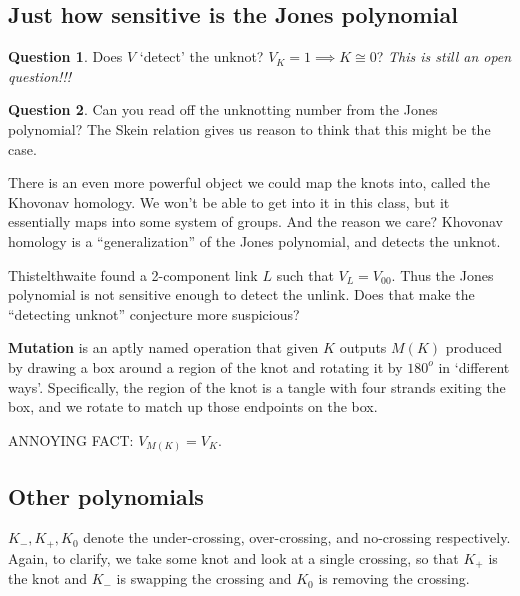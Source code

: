 \documentclass[11pt]{article}
\theoremstyle{plain}
\theoremstyle{definition}
\newtheorem{question}{Question}
\begin{document}
\subsection{Just how sensitive is the Jones polynomial}


\begin{question}
  Does $V$ `detect' the unknot? $V_K = 1 \implies K \cong 0$? \textit{This is still an open question!!!}
\end{question}

\begin{question}
  Can you read off the unknotting number from the Jones polynomial?
  The Skein relation gives us reason to think that this might be the case.
\end{question}

There is an even more powerful object we could map the knots into, called the Khovonav homology.
We won't be able to get into it in this class, but it essentially maps into some system of groups.
And the reason we care? Khovonav homology is a ``generalization'' of the Jones polynomial, and detects the unknot.

Thistelthwaite found a 2-component link $L$ such that $V_L = V_{0 0}$. Thus the Jones polynomial is not
sensitive enough to detect the unlink. Does that make the ``detecting unknot'' conjecture more suspicious?

\bigskip
\textbf{Mutation} is an aptly named operation that given $K$ outputs $M(K)$ produced by
drawing a box around a region of the knot and rotating it by $180^o$ in `different ways'. Specifically, the region of the knot is a tangle with four strands exiting the box, and we rotate to match up those endpoints on the box.

ANNOYING FACT: $V_{M(K)} = V_K$.

\subsection{Other polynomials}

$K_-, K_+, K_0$ denote the under-crossing, over-crossing, and no-crossing respectively. Again, to clarify, we take some knot and look at a single crossing, so that $K_+$ is the knot and $K_-$ is swapping the crossing and $K_0$ is removing the crossing.
\end{document}
